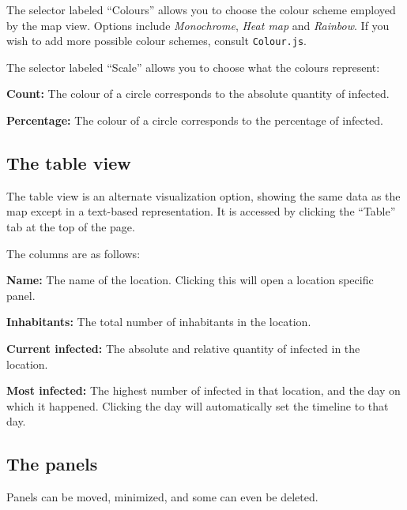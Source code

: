 The selector labeled ``Colours'' allows you to choose the colour scheme employed by the map view. Options include \textit{Monochrome}, \textit{Heat map} and \textit{Rainbow}. If you wish to add more possible colour schemes, consult \texttt{Colour.js}.

The selector labeled ``Scale'' allows you to choose what the colours represent:
\begin{compactitem}
	
	\item \textbf{Count:} The colour of a circle corresponds to the absolute quantity of infected.
	\item \textbf{Percentage:} The colour of a circle corresponds to the percentage of infected.
	
\end{compactitem}

\subsection{The table view}

The table view is an alternate visualization option, showing the same data as the map except in a text-based representation. It is accessed by clicking the ``Table'' tab at the top of the page.

The columns are as follows:

\begin{compactitem}
	
	\item \textbf{Name:} The name of the location. Clicking this will open a location specific panel.
	\item \textbf{Inhabitants:} The total number of inhabitants in the location.
	\item \textbf{Current infected:} The absolute and relative quantity of infected in the location.
	\item \textbf{Most infected:} The highest number of infected in that location, and the day on which it happened. Clicking the day will automatically set the timeline to that day.
	
\end{compactitem}


\subsection{The panels}

Panels can be moved, minimized, and some can even be deleted.

